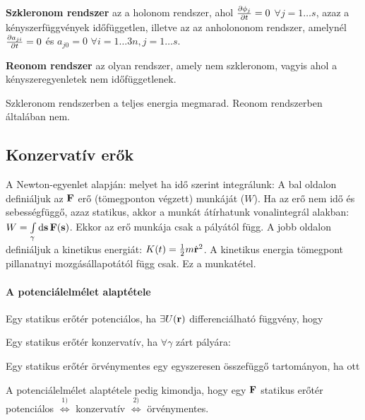    {\bf Szkleronom rendszer} az a holonom rendszer, ahol $\frac{\partial \phi_j}{\partial t}=0$ $\forall j=1\dots s$, azaz a kényszerfüggvények időfüggetlen, illetve az az anholononom rendszer, amelynél $\frac{\partial a_{ji}}{\partial t}=0$ és $a_{j0}=0$ $\forall i=1\dots 3n, j=1\dots s$. 
   
   {\bf Reonom rendszer} az olyan rendszer, amely nem szkleronom, vagyis ahol a kényszeregyenletek nem időfüggetlenek. 
   
   Szkleronom rendszerben a teljes energia megmarad. Reonom rendszerben általában nem.
   
  \subsection{Konzervatív erők}
   
   A Newton-egyenlet alapján:
   melyet ha idő szerint integrálunk:
   A bal oldalon definiáljuk az $\mathbf{F}$ erő (tömegponton végzett) munkáját ($W$). Ha az erő nem idő és sebességfüggő, azaz statikus, akkor a munkát átírhatunk vonalintegrál alakban: $W=\int\limits_{\gamma}^{}\mathrm{d}\mathbf{s}\,\mathbf{F}(\mathbf{s})$. Ekkor az erő munkája csak a pályától függ. A jobb oldalon definiáljuk a kinetikus energiát: $K(t)=\frac{1}{2}m\dot{\mathbf{r}}^2$. A kinetikus energia tömegpont pillanatnyi mozgásállapotától függ csak. Ez a munkatétel.
   
   \paragraph{A potenciálelmélet alaptétele}
   
    Egy statikus erőtér potenciálos, ha $\exists U(\mathbf{r})$ differenciálható függvény, hogy 
    
    Egy statikus erőtér konzervatív, ha $\forall\gamma$ zárt pályára:
     
    Egy statikus erőtér örvénymentes egy egyszeresen összefüggő tartományon, ha ott
    
    A potenciálelmélet alaptétele pedig kimondja, hogy egy $\mathbf{F}$ statikus erőtér  potenciálos $\overset{1)}{\Leftrightarrow}$ konzervatív $\overset{2)}{\Leftrightarrow}$ örvénymentes. 
    
